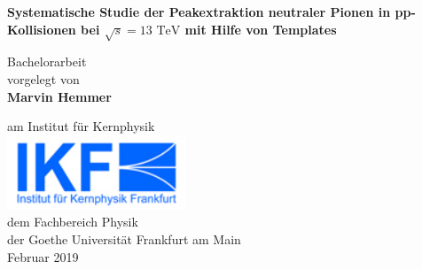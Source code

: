 \vspace*{1cm}

\huge
\textbf{Systematische Studie der Peakextraktion neutraler Pionen in pp-Kollisionen bei $\sqrt{s}=13\text{ TeV}$ mit Hilfe von Templates}

 
\vspace{3.5cm}
\LARGE
Bachelorarbeit\\
vorgelegt von\\
\textbf{Marvin Hemmer}

\vfill
 
\Large
am Institut f\"ur Kernphysik\\
\includegraphics[width=0.4\textwidth]{IKF-Logokl}\\
dem Fachbereich Physik\\
der Goethe Universit\"at Frankfurt am Main\\
Februar 2019
 